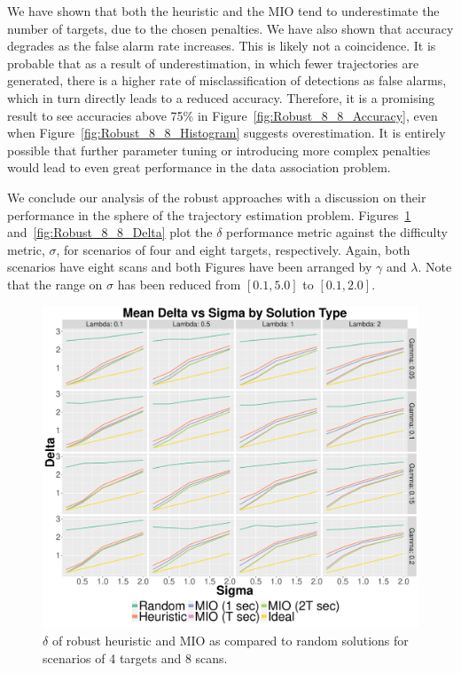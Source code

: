 We have shown that both the heuristic and the MIO tend to underestimate the number of targets, due to the chosen penalties. We have also shown that accuracy degrades as the false alarm rate increases. This is likely not a coincidence. It is probable that as a result of underestimation, in which fewer trajectories are generated, there is a higher rate of misclassification of detections as false alarms, which in turn directly leads to a reduced accuracy. Therefore, it is a promising result to see accuracies above 75\% in Figure~\ref{fig:Robust_8_8_Accuracy}, even when Figure~\ref{fig:Robust_8_8_Histogram} suggests overestimation. It is entirely possible that further parameter tuning or introducing more complex penalties would lead to even great performance in the data association problem.

We conclude our analysis of the robust approaches with a discussion on their performance in the sphere of the trajectory estimation problem. Figures~\ref{fig:Robust_4_8_Delta} and~\ref{fig:Robust_8_8_Delta} plot the $\delta$ performance metric against the difficulty metric, $\sigma$, for scenarios of four and eight targets, respectively. Again, both scenarios have eight scans and both Figures have been arranged by $\gamma$ and $\lambda$. Note that the range on $\sigma$ has been reduced from $[0.1,5.0]$ to $[0.1, 2.0]$. 

\begin{figure}[ht]
  \centering
  \includegraphics[width=\columnwidth]{../Figures/4_8_Delta}
  \caption{$\delta$ of robust heuristic and MIO as compared to random solutions for scenarios of 4 targets and 8 scans.}
  \label{fig:Robust_4_8_Delta}
\end{figure}

